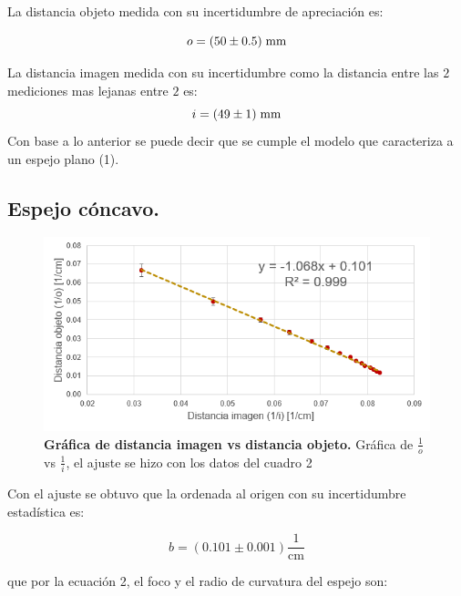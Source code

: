 \documentclass[DIV=calc, paper=a4, fontsize=11pt]{scrartcl}
\begin{document}
La distancia objeto medida con su incertidumbre de apreciación es:

\begin{equation*}
    o= (50 \pm 0.5) \hspace{0.1cm} \text{mm}
\end{equation*}

La distancia imagen medida con su incertidumbre como la distancia entre las $2$ mediciones mas lejanas entre $2$ es:
\begin{equation*}
    i= (49 \pm 1) \hspace{0.1cm} \text{mm} 
\end{equation*}
Con base a lo anterior se puede decir que se cumple el modelo que caracteriza a un espejo plano (1). 

\subsection*{\textcolor{carmine}{Espejo cóncavo.}}

\begin{figure}[H]
    \centering
    \includegraphics[scale=0.8]{graficas/grafica espejo concavo.PNG}
    \caption{\textbf{Gráfica de distancia imagen vs distancia objeto.} Gráfica de $\frac{1}{o}$ vs $\frac{1}{i}$, el ajuste se hizo con los datos del cuadro 2 }
    \label{fig:my_label}
\end{figure}

Con el ajuste se obtuvo que la ordenada al origen con su incertidumbre estadística es:

\begin{equation*}
    b=(0.101 \pm 0.001) \frac{1}{\text{cm}}
\end{equation*}

que por la ecuación 2, el foco y el radio de curvatura del espejo son:
\end{document}

